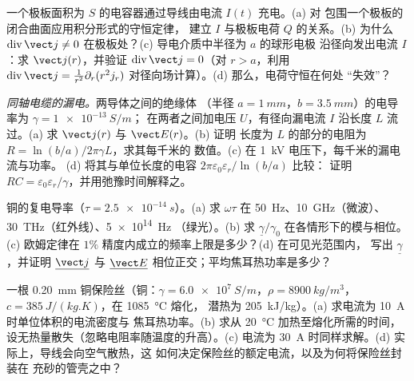 \begin{exercise}[$\star\star$]\label{exo:b2:charges-currents-conduction:5}
一个极板面积为 $S$ 的电容器通过导线由电流 $I(t)$ 充电。(a) 对
包围一个极板的闭合曲面应用积分形式的守恒定律，
建立 $I$ 与极板电荷 $Q$ 的关系。(b) 为什么 $\operatorname{div}\vect j \ne 0$
在极板处？(c) 导电介质中半径为 $a$ 的球形电极
沿径向发出电流 $I$：求 $\vect j(r)$，并验证 $\operatorname{div}
\vect j = 0$（对 $r > a$，利用 $\operatorname{div}\vect j = \frac1{r^2}\partial_r(r^2j_r)$
对径向场计算）。(d) 那么，电荷守恒在何处
“失效”？
\end{exercise}

\begin{exercise}[$\star\star$]\label{exo:b2:charges-currents-conduction:6}
\emph{同轴电缆的漏电。}两导体之间的绝缘体
（半径 $a = \qty{1}{mm}$，$b = \qty{3.5}{mm}$）的电导率为 $\gamma = \qty{1e-13}{S/m}$；
在两者之间加电压 $U$，有径向漏电流 $I$
沿长度 $L$ 流过。(a) 求 $\vect j(r)$ 与 $\vect E(r)$。(b) 证明
长度为 $L$ 的部分的电阻为 $R = \ln(b/a)/2\pi\gamma L$，求其每千米的
数值。(c) 在 \qty{1}{kV} 电压下，每千米的漏电流与功率。
(d) 将其与单位长度的电容 $2\pi\varepsilon_0\varepsilon_r/\ln(b/a)$ 比较：
证明 $RC = \varepsilon_0\varepsilon_r/\gamma$，并用弛豫时间解释之。
\end{exercise}

\begin{exercise}[$\star\star$]\label{exo:b2:charges-currents-conduction:7}
铜的复电导率（$\tau = \qty{2.5e-14}{s}$）。(a) 求 $\omega\tau$ 在
\qty{50}{Hz}、\qty{10}{GHz}（微波）、\qty{30}{THz}（红外线）、\qty{5e14}{Hz}
（绿光）。(b) 求 $\underline\gamma/\gamma_0$ 在各情形下的模与相位。
(c) 欧姆定律在 $1\%$ 精度内成立的频率上限是多少？(d) 在可见光范围内，
写出 $\underline\gamma$，并证明 $\underline{\vect j}$ 与
$\underline{\vect E}$ 相位正交；平均焦耳热功率是多少？
\end{exercise}

\begin{exercise}[$\star\star$]\label{exo:b2:charges-currents-conduction:8}
一根 \qty{0.20}{mm} 铜保险丝（铜：$\gamma = \qty{6.0e7}{S/m}$，$\rho =
\qty{8900}{kg/m^3}$，$c = \qty{385}{J/(kg.K)}$，在 \qty{1085}{\degreeCelsius} 熔化，
潜热为 \qty{205}{kJ/kg}）。(a) 求电流为 \qty{10}{A} 时单位体积的电流密度与
焦耳热功率。(b) 求从 \qty{20}{\degreeCelsius} 加热至熔化所需的时间，
设无热量散失（忽略电阻率随温度的升高）。(c)
电流为 \qty{30}{A} 时同样求解。(d) 实际上，导线会向空气散热，这
如何决定保险丝的额定电流，以及为何将保险丝封装在
充砂的管壳之中？
\end{exercise}

